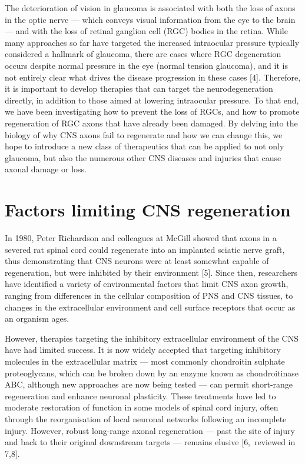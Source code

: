 \documentclass[
  12pt,
  a4paper,
]{book}
\begin{document}
The deterioration of vision in glaucoma is associated with both the loss of axons in the optic nerve --- which conveys visual information from the eye to the brain --- and with the loss of retinal ganglion cell (RGC) bodies in the retina. While many approaches so far have targeted the increased intraocular pressure typically considered a hallmark of glaucoma, there are cases where RGC degeneration occurs despite normal pressure in the eye (normal tension glaucoma), and it is not entirely clear what drives the disease progression in these cases {[}4{]}. Therefore, it is important to develop therapies that can target the neurodegeneration directly, in addition to those aimed at lowering intraocular pressure. To that end, we have been investigating how to prevent the loss of RGCs, and how to promote regeneration of RGC axons that have already been damaged. By delving into the biology of why CNS axons fail to regenerate and how we can change this, we hope to introduce a new class of therapeutics that can be applied to not only glaucoma, but also the numerous other CNS diseases and injuries that cause axonal damage or loss.

\hypertarget{factors-limiting-cns-regeneration}{%
\section{Factors limiting CNS regeneration}\label{factors-limiting-cns-regeneration}}

In 1980, Peter Richardson and colleagues at McGill showed that axons in a severed rat spinal cord could regenerate into an implanted sciatic nerve graft, thus demonstrating that CNS neurons were at least somewhat capable of regeneration, but were inhibited by their environment {[}5{]}. Since then, researchers have identified a variety of environmental factors that limit CNS axon growth, ranging from differences in the cellular composition of PNS and CNS tissues, to changes in the extracellular environment and cell surface receptors that occur as an organism ages.

However, therapies targeting the inhibitory extracellular environment of the CNS have had limited success. It is now widely accepted that targeting inhibitory molecules in the extracellular matrix --- most commonly chondroitin sulphate proteoglycans, which can be broken down by an enzyme known as chondroitinase ABC, although new approaches are now being tested --- can permit short-range regeneration and enhance neuronal plasticity. These treatments have led to moderate restoration of function in some models of spinal cord injury, often through the reorganisation of local neuronal networks following an incomplete injury. However, robust long-range axonal regeneration --- past the site of injury and back to their original downstream targets --- remains elusive {[}6,~reviewed in 7,8{]}.
\end{document}
